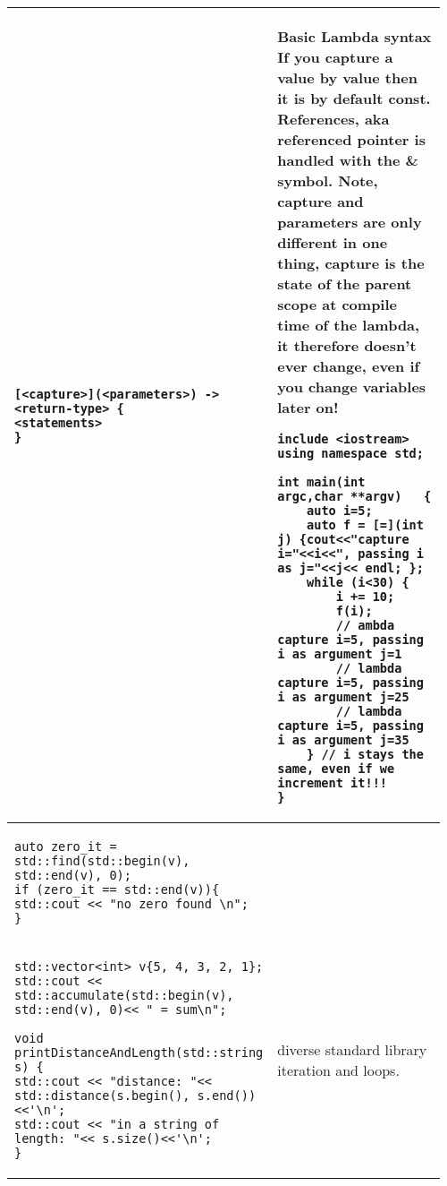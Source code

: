 \documentclass[main.tex,fontsize=8pt,paper=a4,paper=portrait,DIV=calc,]{scrartcl}
\begin{document}
\begin{table}[h!]
\begin{tabular}{|m{0.4\linewidth}|m{0.555\linewidth}|}
\hline
\begin{lstlisting}
[<capture>](<parameters>) -> <return-type> {
<statements>
}
\end{lstlisting}
& Basic Lambda syntax\newline
If you capture a value by value then it is by default const.\newline
 References, aka referenced pointer is handled with the \& symbol.\newline
 Note, capture and parameters are only different in one thing, capture is the state of the parent scope at compile time of the lambda, it therefore doesn't ever change, even if you change variables later on!\newline
\begin{lstlisting}
include <iostream>
using namespace std;

int main(int argc,char **argv)   {
    auto i=5;
    auto f = [=](int j) {cout<<"capture i="<<i<<", passing i as j="<<j<< endl; };
    while (i<30) {
        i += 10;
        f(i);
        // ambda capture i=5, passing i as argument j=1      
        // lambda capture i=5, passing i as argument j=25
        // lambda capture i=5, passing i as argument j=35
    } // i stays the same, even if we increment it!!!
}
\end{lstlisting}
\\
\hline
\begin{lstlisting}
auto zero_it = std::find(std::begin(v), std::end(v), 0);
if (zero_it == std::end(v)){
std::cout << "no zero found \n";
}
\end{lstlisting}
&

\\

\hline
\begin{lstlisting}
std::vector<int> v{5, 4, 3, 2, 1};
std::cout << std::accumulate(std::begin(v), std::end(v), 0)<< " = sum\n";

void printDistanceAndLength(std::string s) {
std::cout << "distance: "<< std::distance(s.begin(), s.end()) <<'\n';
std::cout << "in a string of length: "<< s.size()<<'\n';
}
\end{lstlisting}
& diverse standard library iteration and loops.
\\


\end{tabular}
\end{table}
\end{document}
